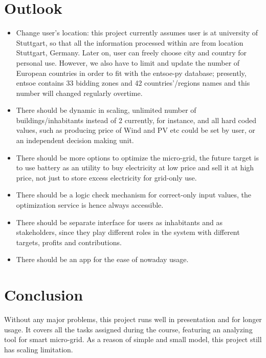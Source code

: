 \documentclass[runningheads]{llncs}
\begin{document}
\section{Outlook}
\begin{itemize}
	\item Change user's location: this project currently assumes user is at university of Stuttgart, so that all the information processed within are from location Stuttgart, Germany. Later on, user can freely choose city and country for personal use. However, we also have to limit and update the number of European countries in order to fit with the entsoe-py database; presently, entsoe contains 33 bidding zones and 42 countries'/regions names and this number will changed regularly  overtime.\cite{Entsoe}

	\item There should be dynamic in scaling, unlimited number of buildings/inhabitants instead of 2 currently, for instance, and all hard coded values, such as producing price of Wind and PV etc could be set by user, or an independent decision making unit.
	
	\item There should be more options to optimize the micro-grid, the future target is to use battery as an utility to buy electricity at low price and sell it at high price, not just to store excess electricity for grid-only use.
	
	\item There should be a logic check mechanism for correct-only input values, the optimization service is hence always accessible.
	
	\item There should be separate interface for users as inhabitants and as stakeholders, since they play different roles in the system with different targets, profits and contributions.
	
	\item There should be an app for the ease of nowaday usage.
\end{itemize}

\section{Conclusion}
Without any major problems, this project runs well in presentation and for longer usage. It covers all the tasks assigned during the course, featuring an analyzing tool for smart micro-grid. As a reason of
simple and small model, this project still has scaling limitation.
\end{document}
